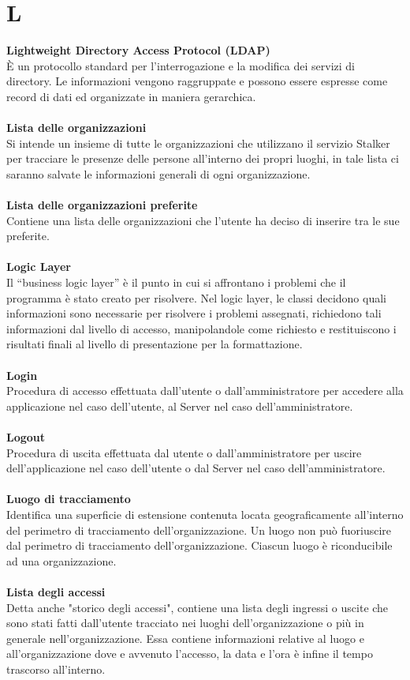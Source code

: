 \section{L}
\textbf{Lightweight Directory Access Protocol (LDAP)}\\
È un protocollo standard per l'interrogazione e la modifica dei servizi di directory. Le informazioni vengono raggruppate e possono essere espresse come record di dati ed organizzate in maniera gerarchica. \\ \\
\textbf{Lista delle organizzazioni}\\
Si intende un insieme di tutte le organizzazioni che utilizzano il servizio Stalker per tracciare le presenze delle persone all’interno dei propri luoghi, in tale lista ci saranno salvate le informazioni generali di ogni organizzazione.\\ \\
\textbf{Lista delle organizzazioni preferite}\\
Contiene una lista delle organizzazioni che l'utente ha deciso di inserire tra le sue preferite. \\ \\
\textbf{Logic Layer}\\
Il “business logic layer” è il punto in cui si affrontano i problemi che il programma è stato creato per risolvere. Nel logic layer, le classi decidono quali informazioni sono necessarie per risolvere i problemi assegnati, richiedono tali informazioni dal livello di accesso, manipolandole come richiesto e restituiscono i risultati finali al livello di presentazione per la formattazione. \\ \\
\textbf{Login} \\
Procedura di accesso effettuata dall'utente o dall'amministratore per accedere alla applicazione nel caso dell'utente, al Server nel caso dell'amministratore.\\ \\
\textbf{Logout} \\
Procedura di uscita effettuata dal utente o dall'amministratore per uscire dell'applicazione nel caso dell'utente o dal Server nel caso dell'amministratore. \\ \\
\textbf{Luogo di tracciamento}\\
Identifica una superficie di estensione contenuta locata geograficamente all'interno del perimetro di tracciamento dell'organizzazione. Un luogo non può fuoriuscire dal perimetro di tracciamento dell'organizzazione. Ciascun luogo è riconducibile ad una organizzazione.\\ \\
\textbf{Lista degli accessi}\\
Detta anche "storico degli accessi", contiene una lista degli ingressi o uscite che sono stati fatti dall'utente tracciato nei luoghi dell'organizzazione o più in generale nell'organizzazione. Essa contiene informazioni relative al luogo e all'organizzazione dove e avvenuto l'accesso, la data e l'ora è infine il tempo trascorso all'interno.\\ \\
\clearpage